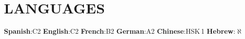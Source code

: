 \section{LANGUAGES}
\begin{itemize}[leftmargin=0in, label={}]
  \small{\item{
    \textbf{Spanish}\hspace{2pt}:\hspace{4pt}C2\hspace{12pt}
    \textbf{English}\hspace{2pt}:\hspace{4pt}C2\hspace{12pt}
    \textbf{French}\hspace{2pt}:\hspace{4pt}B2\hspace{12pt}
    \textbf{German}\hspace{2pt}:\hspace{4pt}A2\hspace{12pt}
    \textbf{Chinese}\hspace{2pt}:\hspace{4pt}HSK\,1\hspace{12pt}
    \textbf{Hebrew}\hspace{2pt}:\hspace{4pt}$\aleph$
  }}
\end{itemize}
